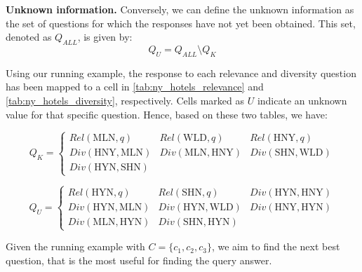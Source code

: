 \textbf{Unknown information.} Conversely, we can define the unknown information as the set of questions for which the responses have not yet been obtained. This set, denoted as \( Q_{ALL} \), is given by:
\[
Q_U = Q_{ALL} \setminus Q_K
\]

Using our running example, the response to each relevance and diversity question has been mapped to a cell in \autoref{tab:ny_hotels_relevance} and \autoref{tab:ny_hotels_diversity}, respectively. Cells marked as $U$ indicate an unknown value for that specific question. Hence, based on these two tables, we have:

\[
Q_K = \left\{
\begin{array}{lll}
Rel(\text{MLN}, q) & Rel(\text{WLD}, q) & Rel(\text{HNY}, q) \\
Div(\text{HNY}, \text{MLN}) & Div(\text{MLN}, \text{HNY}) & Div(\text{SHN}, \text{WLD}) \\
Div(\text{HYN}, \text{SHN}) & &
\end{array}
\right.
\]


\[
Q_U = \left\{
\begin{array}{lll}
Rel(\text{HYN}, q) & Rel(\text{SHN}, q) & Div(\text{HYN}, \text{HNY}) \\
Div(\text{HYN}, \text{MLN}) & Div(\text{HYN}, \text{WLD}) & Div(\text{HNY}, \text{HYN}) \\
Div(\text{MLN}, \text{HYN}) & Div(\text{SHN}, \text{HYN}) &
\end{array}
\right.
\]

Given the running example with $C=\{c_1,c_2,c_3\}$, we aim to find the next best question, that is the most useful for finding the query answer. 

